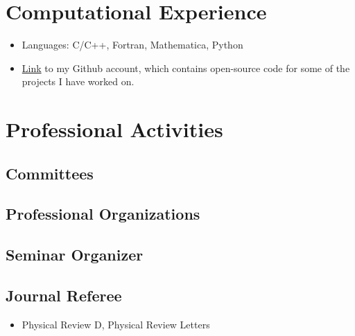 \documentclass{my_cv}
\begin{document}
\section{Computational Experience}
\begin{itemize}
\item Languages: C/C++, Fortran, Mathematica, Python 
\item \href{https://github.com/JLRipley314}{Link} to
      my Github account, which contains open-source code for
      some of the projects I have worked on.
\end{itemize}
\section{Professional Activities}
\subsection{Committees}
\begin{itemize}
\end{itemize}
\subsection{Professional Organizations}
\begin{itemize}
\end{itemize}
\subsection{Seminar Organizer}
\begin{itemize}
\end{itemize}
\subsection{Journal Referee}
\begin{itemize}
\item Physical Review D, Physical Review Letters
\end{itemize}
\end{document}
